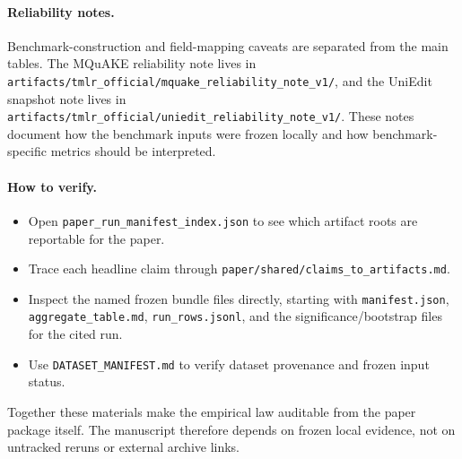 \paragraph{Reliability notes.}
Benchmark-construction and field-mapping caveats are separated from the main tables. The MQuAKE reliability note lives in \texttt{artifacts/tmlr\_official/mquake\_reliability\_note\_v1/}, and the UniEdit snapshot note lives in \texttt{artifacts/tmlr\_official/uniedit\_reliability\_note\_v1/}. These notes document how the benchmark inputs were frozen locally and how benchmark-specific metrics should be interpreted.

\paragraph{How to verify.}
\begin{itemize}[leftmargin=1.5em]
\item Open \texttt{paper\_run\_manifest\_index.json} to see which artifact roots are reportable for the paper.
\item Trace each headline claim through \texttt{paper/shared/claims\_to\_artifacts.md}.
\item Inspect the named frozen bundle files directly, starting with \texttt{manifest.json}, \texttt{aggregate\_table.md}, \texttt{run\_rows.jsonl}, and the significance/bootstrap files for the cited run.
\item Use \texttt{DATASET\_MANIFEST.md} to verify dataset provenance and frozen input status.
\end{itemize}

Together these materials make the empirical law auditable from the paper package itself. The manuscript therefore depends on frozen local evidence, not on untracked reruns or external archive links.
